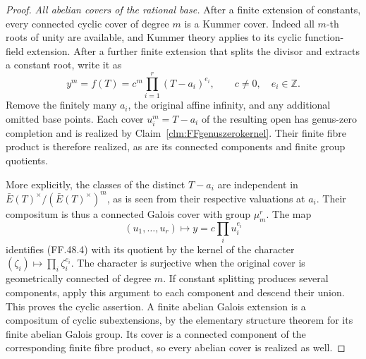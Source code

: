 \begin{proof}
\emph{All abelian covers of the rational base.}
After a finite extension of constants, every connected
cyclic cover of degree \(m\) is a Kummer cover.
Indeed all \(m\)-th roots of unity are available,
and Kummer theory applies to its cyclic function-field
extension. After a further finite extension that splits
the divisor and extracts a constant root, write it as
\[
       y^m=f(T)=c^m\prod_{i=1}^r(T-a_i)^{e_i},
           \qquad c\ne0,\quad e_i\in\mathbb Z.
                                                        \tag{FF.48.4}
\]
Remove the finitely many \(a_i\), the original affine
infinity, and any additional omitted base points.
Each cover \(u_i^m=T-a_i\) of the resulting open
has genus-zero completion and is realized by
Claim~\ref{clm:FFgenuszerokernel}. Their finite fibre
product is therefore realized, as are its connected
components and finite group quotients.

More explicitly, the classes of the distinct
\(T-a_i\) are independent in
\(\bar E(T)^\times/(\bar E(T)^\times)^m\), as is
seen from their respective valuations at \(a_i\).
Their compositum is thus a connected Galois cover
with group \(\mu_m^r\). The map
\[
       (u_1,\ldots,u_r)\longmapsto
                     y=c\prod_i u_i^{e_i}
                                                        \tag{FF.48.5}
\]
identifies (FF.48.4) with its quotient by the kernel
of the character
\((\zeta_i)\mapsto\prod_i\zeta_i^{e_i}\).
The character is surjective when the original cover
is geometrically connected of degree \(m\). If
constant splitting produces several components, apply
this argument to each component and descend their
union. This proves the cyclic assertion. A finite
abelian Galois extension is a compositum of cyclic
subextensions, by the elementary structure theorem
for its finite abelian Galois group. Its cover is a
connected component of the corresponding finite fibre
product, so every abelian cover is realized as well.


\end{proof}
